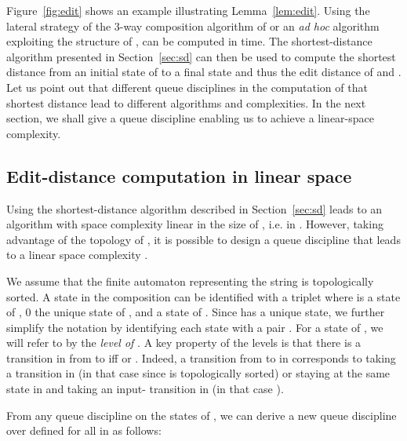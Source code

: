 \documentclass{llncs}
\newcommand{\0}{\overline{0}}
\newcommand{\1}{\overline{1}}
\newcommand{\+}{\oplus}
\renewcommand{\.}{\otimes}
\begin{document}
Figure~\ref{fig:edit} shows an example illustrating Lemma~\ref{lem:edit}.
Using the lateral strategy of the 3-way composition algorithm of
\cite{3way} or an \emph{ad hoc} algorithm exploiting the structure of
,  can be computed in  time. The
shortest-distance algorithm presented in Section~\ref{sec:sd} can then
be used to compute the shortest distance from an initial state of 
to a final state and thus the edit distance of  and . Let us
point out that different queue disciplines in the computation of that
shortest distance lead to different algorithms and complexities.  In
the next section, we shall give a queue discipline enabling us to
achieve a linear-space complexity.

\subsection{Edit-distance computation in linear space}

Using the shortest-distance algorithm described in
Section~\ref{sec:sd} leads to an algorithm with space complexity
linear in the size of , i.e. in . However, taking
advantage of the topology of , it is possible to design a queue
discipline that leads to a linear space complexity .

We assume that the finite automaton  representing the string  is
topologically sorted. A state  in the composition  can be identified with a triplet  where  is a
state of , 0 the unique state of , and  a state of . Since
 has a unique state, we further simplify the notation by
identifying each state  with a pair . For a state  of , we will refer to  by the \emph{level of }. A key
property of the levels is that there is a transition in  from 
to  iff  or .
Indeed, a transition from  to  in  corresponds to
taking a transition in  (in that case  since  is
topologically sorted) or staying at the same state in  and
taking an input- transition in  (in that case ).

From any queue discipline  on the states of , we can derive
a new queue discipline  over  defined for all  in
 as follows:
\end{document}
